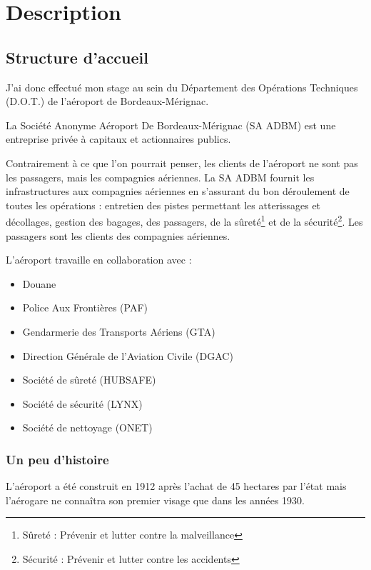 \chapter{Description}

\section{Structure d'accueil}

J’ai donc effectué mon stage au sein du Département des Opérations Techniques (D.O.T.) de l’aéroport de Bordeaux-Mérignac.

La Société Anonyme Aéroport De Bordeaux-Mérignac (SA ADBM) est une entreprise privée à capitaux et actionnaires publics.\newline

Contrairement à ce que l’on pourrait penser, les clients de l’aéroport ne sont pas les passagers, mais les compagnies aériennes. La SA ADBM fournit les infrastructures aux compagnies aériennes en s’assurant du bon déroulement de toutes les opérations : entretien des pistes permettant les atterissages et décollages, gestion des bagages, des passagers, de la sûreté\footnote{Sûreté : Prévenir et lutter contre la malveillance} et de la sécurité\footnote{Sécurité : Prévenir et lutter contre les accidents}. Les passagers sont les clients des compagnies aériennes.\newline

L’aéroport travaille en collaboration avec :


\begin{itemize}
  \item Douane
  \item Police Aux Frontières (PAF)
  \item Gendarmerie des Transports Aériens (GTA)
  \item Direction Générale de l'Aviation Civile (DGAC)
  \item Société de sûreté (HUBSAFE)
  \item Société de sécurité (LYNX)
  \item Société de nettoyage (ONET)\newline
\end{itemize}


\subsection{Un peu d'histoire}

L'aéroport a été construit en 1912 après l'achat de 45 hectares par l'état mais l'aérogare ne connaîtra son premier visage que dans les années 1930.


